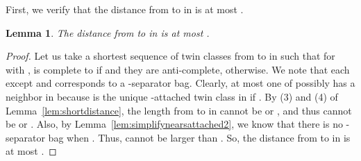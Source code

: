 \documentclass[11pt]{elsarticle}
\newtheorem{lemma}[theorem]{Lemma}
\begin{document}
First, we verify that the distance from  to  in  is at most .


\begin{lemma}
\label{lem:distancec1c2}
The distance from  to  in  is at most .
\end{lemma}
\begin{proof}
Let us take a shortest sequence of twin classes  from  to  in  such that for  with ,  is complete to  if  and they are anti-complete, otherwise. We note that each  except  and  corresponds to a -separator bag.
 Clearly, at most one of  possibly has a neighbor in  because  is the unique -attached twin class in  if .
 By (3) and (4) of Lemma~\ref{lem:shortdistance}, 
 the length from  to  in  cannot be  or , and thus  cannot be  or .
 Also, by Lemma~\ref{lem:simplifynearsattached2}, 
 we know that there is no -separator bag when .
 Thus,  cannot be larger than .
So, the distance from  to  in  is at most  . 
\end{proof}
\end{document}
